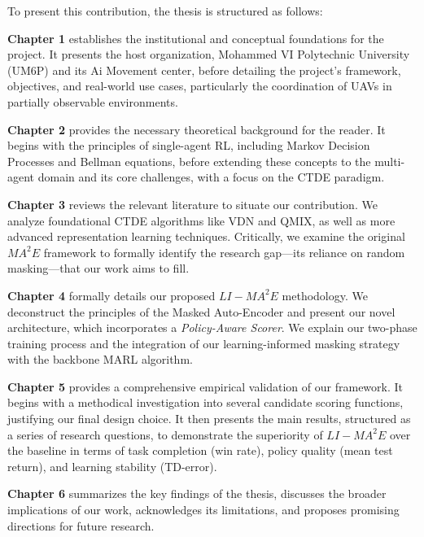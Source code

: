 To present this contribution, the thesis is structured as follows:

\textbf{Chapter 1} establishes the institutional and conceptual foundations for the project. It presents the host organization, Mohammed VI Polytechnic University (UM6P) and its Ai Movement center, before detailing the project's framework, objectives, and real-world use cases, particularly the coordination of UAVs in partially observable environments.

\textbf{Chapter 2} provides the necessary theoretical background for the reader. It begins with the principles of single-agent RL, including Markov Decision Processes and Bellman equations, before extending these concepts to the multi-agent domain and its core challenges, with a focus on the CTDE paradigm.

\textbf{Chapter 3} reviews the relevant literature to situate our contribution. We analyze foundational CTDE algorithms like VDN and QMIX, as well as more advanced representation learning techniques. Critically, we examine the original $MA^2E$ framework to formally identify the research gap—its reliance on random masking—that our work aims to fill.

\textbf{Chapter 4} formally details our proposed $LI-MA^2E$ methodology. We deconstruct the principles of the Masked Auto-Encoder and present our novel architecture, which incorporates a \textit{Policy-Aware Scorer}. We explain our two-phase training process and the integration of our learning-informed masking strategy with the backbone MARL algorithm.

\textbf{Chapter 5} provides a comprehensive empirical validation of our framework. It begins with a methodical investigation into several candidate scoring functions, justifying our final design choice. It then presents the main results, structured as a series of research questions, to demonstrate the superiority of $LI-MA^2E$ over the baseline in terms of task completion (win rate), policy quality (mean test return), and learning stability (TD-error).

\textbf{Chapter 6} summarizes the key findings of the thesis, discusses the broader implications of our work, acknowledges its limitations, and proposes promising directions for future research.
